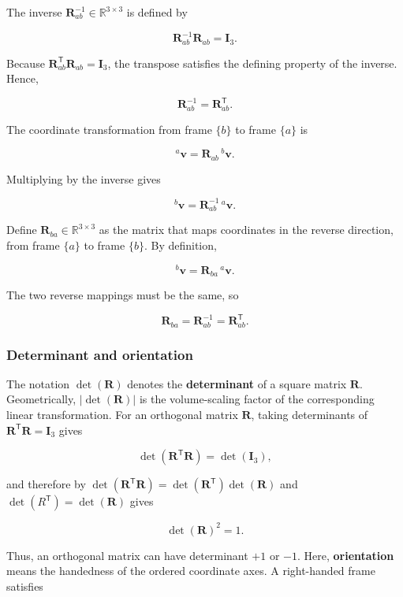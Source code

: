 \documentclass[
  australian,
  12pt,
  letterpaper,
  DIV=11,
  numbers=noendperiod,
  twoside]{scrreprt}
\begin{document}
The inverse \(\mathbf R_{ab}^{-1}\in\mathbb R^{3\times3}\) is defined by

\[
\mathbf R_{ab}^{-1}\mathbf R_{ab}=\mathbf I_3.
\]

Because \(\mathbf R_{ab}^{\mathsf T}\mathbf R_{ab}=\mathbf I_3\), the
transpose satisfies the defining property of the inverse. Hence,

\[
\boxed{\mathbf R_{ab}^{-1}=\mathbf R_{ab}^{\mathsf T}}.
\]

The coordinate transformation from frame \(\{b\}\) to frame \(\{a\}\) is

\[
{}^{a}\mathbf v=\mathbf R_{ab}\,{}^{b}\mathbf v.
\]

Multiplying by the inverse gives

\[
{}^{b}\mathbf v=\mathbf R_{ab}^{-1}\,{}^{a}\mathbf v.
\]

Define \(\mathbf R_{ba}\in\mathbb R^{3\times3}\) as the matrix that maps
coordinates in the reverse direction, from frame \(\{a\}\) to frame
\(\{b\}\). By definition,

\[
{}^{b}\mathbf v=\mathbf R_{ba}\,{}^{a}\mathbf v.
\]

The two reverse mappings must be the same, so

\[
\boxed{
\mathbf R_{ba}
=
\mathbf R_{ab}^{-1}
=
\mathbf R_{ab}^{\mathsf T}
}.
\]

\subsubsection{Determinant and
orientation}\label{determinant-and-orientation}

The notation \(\det(\mathbf R)\) denotes the \textbf{determinant} of a
square matrix \(\mathbf R\). Geometrically, \(|\det(\mathbf R)|\) is the
volume-scaling factor of the corresponding linear transformation. For an
orthogonal matrix \(\mathbf R\), taking determinants of
\(\mathbf R^{\mathsf T}\mathbf R=\mathbf I_3\) gives

\[
\det(\mathbf R^{\mathsf T}\mathbf R)
=
\det(\mathbf I_3),
\]

and therefore by
\(\det(\mathbf R^{\mathsf T}\mathbf R) = \det(\mathbf R^{\mathsf T})\det(\mathbf R)\)
and \(\det(R^{\mathsf T})=\det(\mathbf R)\) gives

\[
\det(\mathbf R)^2=1.
\]

Thus, an orthogonal matrix can have determinant \(+1\) or \(-1\). Here,
\textbf{orientation} means the handedness of the ordered coordinate
axes. A right-handed frame satisfies
\end{document}
